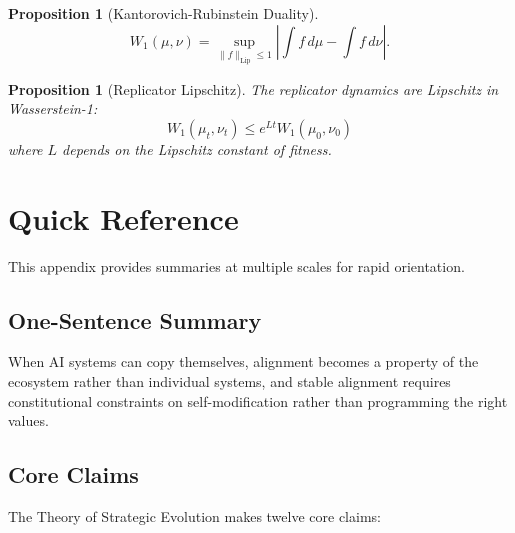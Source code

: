 \documentclass[12pt]{article}
\newtheorem{proposition}[theorem]{Proposition}
\begin{document}
\begin{proposition}[Kantorovich-Rubinstein Duality]
\[
W_1(\mu, \nu) = \sup_{\|f\|_{\text{Lip}} \leq 1} \left| \int f \, d\mu - \int f \, d\nu \right|.
\]
\end{proposition}

\begin{proposition}[Replicator Lipschitz]
The replicator dynamics are Lipschitz in Wasserstein-1:
\[
W_1(\mu_t, \nu_t) \leq e^{Lt} W_1(\mu_0, \nu_0)
\]
where $L$ depends on the Lipschitz constant of fitness.
\end{proposition}


\section{Quick Reference}
\label{app:quickref}

This appendix provides summaries at multiple scales for rapid orientation.

\subsection{One-Sentence Summary}

When AI systems can copy themselves, alignment becomes a property of the ecosystem rather than individual systems, and stable alignment requires constitutional constraints on self-modification rather than programming the right values.

\subsection{Core Claims}

The Theory of Strategic Evolution makes twelve core claims:
\end{document}
